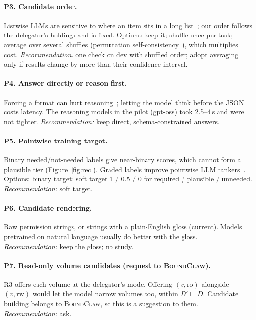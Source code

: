 \documentclass[10pt]{article}
\newcommand{\BC}{{\mdseries\textsc{BoundClaw}}}
\begin{document}
\paragraph{P3. Candidate order.} Listwise LLMs are sensitive to where an item sits in a long list~\cite{lostmiddle}; our
order follows the delegator's holdings and is fixed. Options: keep it; shuffle once per task; average over several shuffles
(permutation self-consistency~\cite{permsc}), which multiplies cost. \emph{Recommendation:} one check on dev with shuffled
order; adopt averaging only if results change by more than their confidence interval.

\paragraph{P4. Answer directly or reason first.} Forcing a format can hurt reasoning~\cite{speakfreely}; letting the model
think before the JSON costs latency. The reasoning models in the pilot (gpt-oss) took 2.5--4\,s and were not tighter.
\emph{Recommendation:} keep direct, schema-constrained answers.

\paragraph{P5. Pointwise training target.} Binary needed/not-needed labels give near-binary scores, which cannot form a
plausible tier (Figure~\ref{fig:rec}). Graded labels improve pointwise LLM rankers~\cite{beyondyesno}. Options: binary target;
soft target 1 / 0.5 / 0 for required / plausible / unneeded. \emph{Recommendation:} soft target.

\paragraph{P6. Candidate rendering.} Raw permission strings, or strings with a plain-English gloss (current). Models
pretrained on natural language usually do better with the gloss. \emph{Recommendation:} keep the gloss; no study.

\paragraph{P7. Read-only volume candidates (request to \BC{}).} R3 offers each volume at the delegator's mode. Offering
$(v,\mathrm{ro})$ alongside $(v,\mathrm{rw})$ would let the model narrow volumes too, within $D'\sqsubseteq D$. Candidate
building belongs to \BC{}, so this is a suggestion to them. \emph{Recommendation:} ask.
\end{document}
